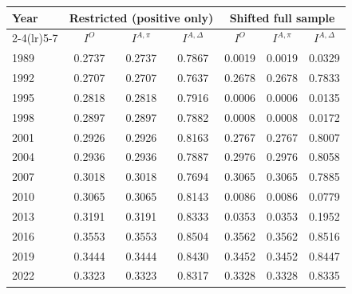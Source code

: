 \begin{tabular}{lcccccc}
\toprule
Year & \multicolumn{3}{c}{Restricted (positive only)} & \multicolumn{3}{c}{Shifted full sample} \\
\cmidrule(lr){2-4}\cmidrule(lr){5-7}
& $I^{O}$ & $I^{A,\pi}$ & $I^{A,\Delta}$ & $I^{O}$ & $I^{A,\pi}$ & $I^{A,\Delta}$ \\
\midrule
1989 & 0.2737 & 0.2737 & 0.7867 & 0.0019 & 0.0019 & 0.0329 \\
1992 & 0.2707 & 0.2707 & 0.7637 & 0.2678 & 0.2678 & 0.7833 \\
1995 & 0.2818 & 0.2818 & 0.7916 & 0.0006 & 0.0006 & 0.0135 \\
1998 & 0.2897 & 0.2897 & 0.7882 & 0.0008 & 0.0008 & 0.0172 \\
2001 & 0.2926 & 0.2926 & 0.8163 & 0.2767 & 0.2767 & 0.8007 \\
2004 & 0.2936 & 0.2936 & 0.7887 & 0.2976 & 0.2976 & 0.8058 \\
2007 & 0.3018 & 0.3018 & 0.7694 & 0.3065 & 0.3065 & 0.7885 \\
2010 & 0.3065 & 0.3065 & 0.8143 & 0.0086 & 0.0086 & 0.0779 \\
2013 & 0.3191 & 0.3191 & 0.8333 & 0.0353 & 0.0353 & 0.1952 \\
2016 & 0.3553 & 0.3553 & 0.8504 & 0.3562 & 0.3562 & 0.8516 \\
2019 & 0.3444 & 0.3444 & 0.8430 & 0.3452 & 0.3452 & 0.8447 \\
2022 & 0.3323 & 0.3323 & 0.8317 & 0.3328 & 0.3328 & 0.8335 \\
\bottomrule
\end{tabular}

